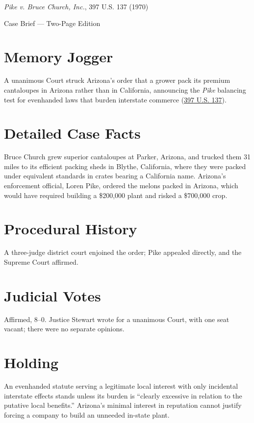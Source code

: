 \documentclass[12pt]{article}
\begin{document}
\begin{center}
{\LARGE \textit{Pike v. Bruce Church, Inc.}, 397 U.S. 137 (1970)\par}
\vspace{0.5em}
{\large Case Brief --- Two-Page Edition\par}
\end{center}

\section{Memory Jogger}
A unanimous Court struck Arizona's order that a grower pack its premium cantaloupes in Arizona rather than in California, announcing the \textit{Pike} balancing test for evenhanded laws that burden interstate commerce (\href{https://supreme.justia.com/cases/federal/us/397/137/}{397 U.S. 137}).

\section{Detailed Case Facts}
Bruce Church grew superior cantaloupes at Parker, Arizona, and trucked them 31 miles to its efficient packing sheds in Blythe, California, where they were packed under equivalent standards in crates bearing a California name. Arizona's enforcement official, Loren Pike, ordered the melons packed in Arizona, which would have required building a \$200,000 plant and risked a \$700,000 crop.

\section{Procedural History}
A three-judge district court enjoined the order; Pike appealed directly, and the Supreme Court affirmed.

\section{Judicial Votes}
Affirmed, 8--0. Justice Stewart wrote for a unanimous Court, with one seat vacant; there were no separate opinions.

\section{Holding}
An evenhanded statute serving a legitimate local interest with only incidental interstate effects stands unless its burden is ``clearly excessive in relation to the putative local benefits.'' Arizona's minimal interest in reputation cannot justify forcing a company to build an unneeded in-state plant.
\end{document}
